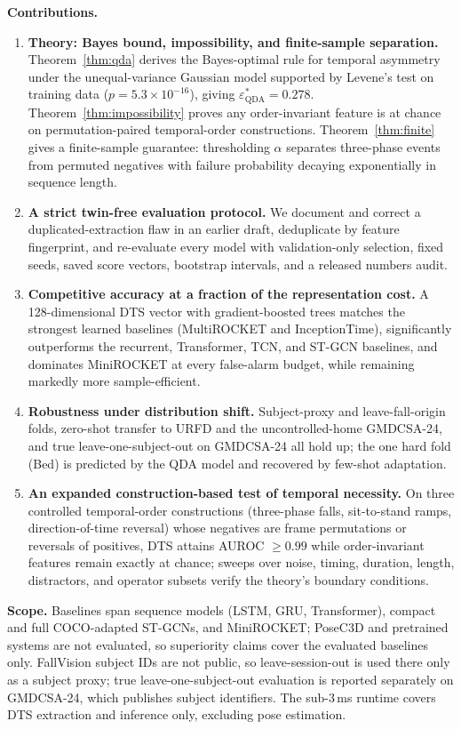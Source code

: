 \textbf{Contributions.}
\begin{enumerate}
\item \textbf{Theory: Bayes bound, impossibility, and finite-sample separation.} Theorem~\ref{thm:qda} derives the Bayes-optimal rule for temporal asymmetry under the unequal-variance Gaussian model supported by Levene's test on training data ($p=5.3{\times}10^{-16}$), giving $\varepsilon^{*}_{\mathrm{QDA}}=0.278$. Theorem~\ref{thm:impossibility} proves any order-invariant feature is at chance on permutation-paired temporal-order constructions. Theorem~\ref{thm:finite} gives a finite-sample guarantee: thresholding $\alpha$ separates three-phase events from permuted negatives with failure probability decaying exponentially in sequence length.
\item \textbf{A strict twin-free evaluation protocol.} We document and correct a duplicated-extraction flaw in an earlier draft, deduplicate by feature fingerprint, and re-evaluate every model with validation-only selection, fixed seeds, saved score vectors, bootstrap intervals, and a released numbers audit.
\item \textbf{Competitive accuracy at a fraction of the representation cost.} A 128-dimensional DTS vector with gradient-boosted trees matches the strongest learned baselines (MultiROCKET and InceptionTime), significantly outperforms the recurrent, Transformer, TCN, and ST-GCN baselines, and dominates MiniROCKET at every false-alarm budget, while remaining markedly more sample-efficient.
\item \textbf{Robustness under distribution shift.} Subject-proxy and leave-fall-origin folds, zero-shot transfer to URFD and the uncontrolled-home GMDCSA-24, and true leave-one-subject-out on GMDCSA-24 all hold up; the one hard fold (Bed) is predicted by the QDA model and recovered by few-shot adaptation.
\item \textbf{An expanded construction-based test of temporal necessity.} On three controlled temporal-order constructions (three-phase falls, sit-to-stand ramps, direction-of-time reversal) whose negatives are frame permutations or reversals of positives, DTS attains AUROC $\geq0.99$ while order-invariant features remain exactly at chance; sweeps over noise, timing, duration, length, distractors, and operator subsets verify the theory's boundary conditions.
\end{enumerate}

\textbf{Scope.} Baselines span sequence models (LSTM, GRU, Transformer), compact and full COCO-adapted ST-GCNs, and MiniROCKET; PoseC3D \citep{duan2022posec3d} and pretrained systems are not evaluated, so superiority claims cover the evaluated baselines only. FallVision subject IDs are not public, so leave-session-out is used there only as a subject proxy; true leave-one-subject-out evaluation is reported separately on GMDCSA-24, which publishes subject identifiers. The sub-3\,ms runtime covers DTS extraction and inference only, excluding pose estimation.

